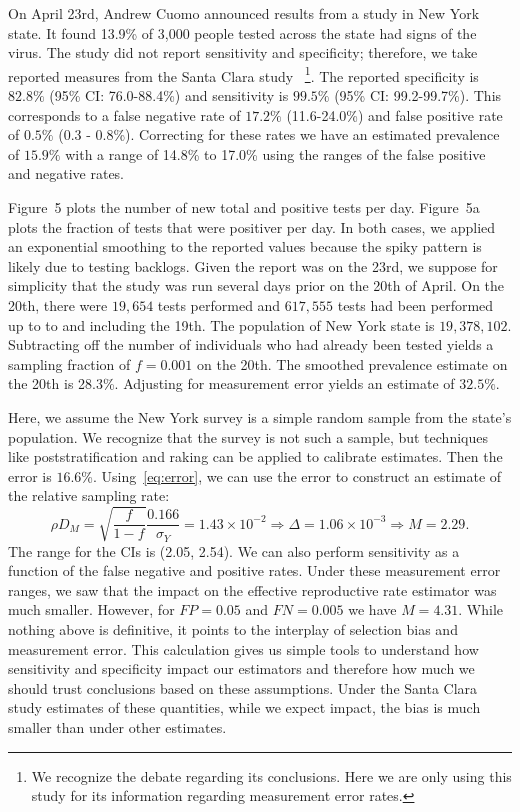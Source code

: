 \documentclass[12pt]{article}
\begin{document}
On April 23rd, Andrew Cuomo announced results from a study in New York state.  It found 13.9\% of 3,000 people tested across the state had signs of the virus.  The study did not report sensitivity and specificity; therefore, we take reported measures from the Santa Clara study~\cite{Bendavid2020} \footnote{We recognize the debate regarding its conclusions.  Here we are only using this study for its information regarding measurement error rates.}.  The reported specificity is $82.8\%$ (95\% CI: 76.0-88.4\%) and sensitivity is $99.5\%$ (95\% CI: 99.2-99.7\%).  This corresponds to a false negative rate of $17.2\%$ (11.6-24.0\%) and false positive rate of $0.5\%$ (0.3 - 0.8\%).  Correcting for these rates we have an estimated prevalence of $15.9\%$ with a range of 14.8\% to 17.0\% using the ranges of the false positive and negative rates.

Figure~5 plots the number of new total and positive tests per day.  Figure~5a plots the fraction of tests that were positiver per day.  In both cases, we applied an exponential smoothing to the reported values because the spiky pattern is likely due to testing backlogs.  Given the report was on the 23rd, we suppose for simplicity that the study was run several days prior on the 20th of April. On the 20th, there were $19,654$ tests performed and $617,555$ tests had been performed up to to and including the 19th. The population of New York state is $19,378,102$.   Subtracting off the number of individuals who had already been tested yields a sampling fraction of $f = 0.001$ on the 20th.  The smoothed prevalence estimate on the 20th is 28.3\%.  Adjusting for measurement error yields an estimate of $32.5\%$.

Here, we assume the New York survey is a simple random sample from the state's population. We recognize that the survey is not such a sample, but techniques like poststratification and raking can be applied to calibrate estimates. Then the error is $16.6$\%.  Using~\eqref{eq:error}, we can use the error to construct an estimate of the relative sampling rate:
\[
\rho D_M = \sqrt{\frac{f}{1-f}} \frac{\text{0.166}}{\sigma_Y} = 1.43 \times 10^{-2} \Rightarrow \Delta = 1.06 \times 10^{-3} \Rightarrow M = 2.29.
\]
The range for the CIs is (2.05, 2.54).  We can also perform sensitivity as a function of the false negative and positive rates.  Under these measurement error ranges, we saw that the impact on the effective reproductive rate estimator was much smaller.  However, for $FP = 0.05$ and $FN = 0.005$ we have $M = 4.31$.  While nothing above is definitive, it points to the interplay of selection bias and measurement error.  This calculation gives us simple tools to understand how sensitivity and specificity impact our estimators and therefore how much we should trust conclusions based on these assumptions.  Under the Santa Clara study estimates of these quantities, while we expect impact, the bias is much smaller than under other estimates.
\end{document}
